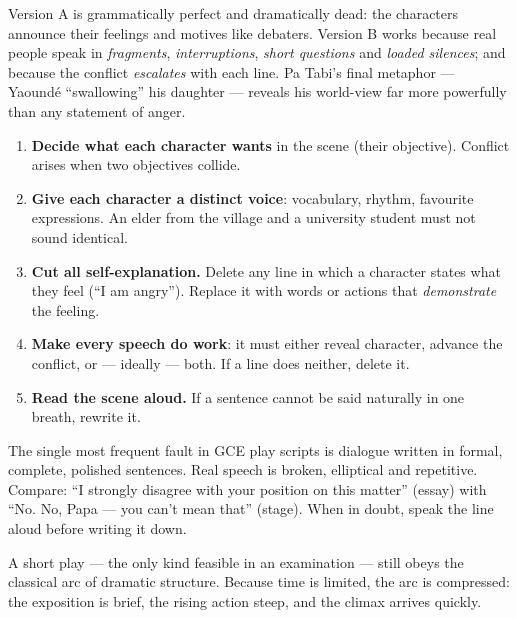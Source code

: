\documentclass[11pt]{article}
\newcommand{\cle}[1]{{\popxbold\color{popdark}#1}}
\newcounter{popsec}
\newcounter{popsub}
\newcommand{\courssub}[1]{%
  \stepcounter{popsub}%
  \par\vspace{9pt}\noindent{\popxbold\fontsize{11.5}{13}\selectfont\color{popink}{\color{poporange}\thepopsec.\thepopsub}\hspace{6pt}#1}\par\nopagebreak\vspace{4pt}
}
\begin{document}
Version A is grammatically perfect and dramatically dead: the characters announce their feelings and motives like debaters. Version B works because real people speak in \emph{fragments}, \emph{interruptions}, \emph{short questions} and \emph{loaded silences}; and because the conflict \emph{escalates} with each line. Pa Tabi's final metaphor — Yaoundé ``swallowing'' his daughter — reveals his world-view far more powerfully than any statement of anger.

\begin{methode}
\begin{enumerate}
\item \textbf{Decide what each character wants} in the scene (their \cle{objective}). Conflict arises when two objectives collide.
\item \textbf{Give each character a distinct voice}: vocabulary, rhythm, favourite expressions. An elder from the village and a university student must not sound identical.
\item \textbf{Cut all self-explanation.} Delete any line in which a character states what they feel (``I am angry''). Replace it with words or actions that \emph{demonstrate} the feeling.
\item \textbf{Make every speech do work}: it must either reveal character, advance the conflict, or — ideally — both. If a line does neither, delete it.
\item \textbf{Read the scene aloud.} If a sentence cannot be said naturally in one breath, rewrite it.
\end{enumerate}
\end{methode}

\begin{attention}
The single most frequent fault in GCE play scripts is dialogue written in formal, complete, polished sentences. Real speech is broken, elliptical and repetitive. Compare: ``I strongly disagree with your position on this matter'' (essay) with ``No. No, Papa — you can't mean that'' (stage). When in doubt, speak the line aloud before writing it down.
\end{attention}

\courssub{The Structure of a One-Act Play}

A short play — the only kind feasible in an examination — still obeys the classical arc of dramatic structure. Because time is limited, the arc is compressed: the exposition is brief, the rising action steep, and the climax arrives quickly.
\end{document}
